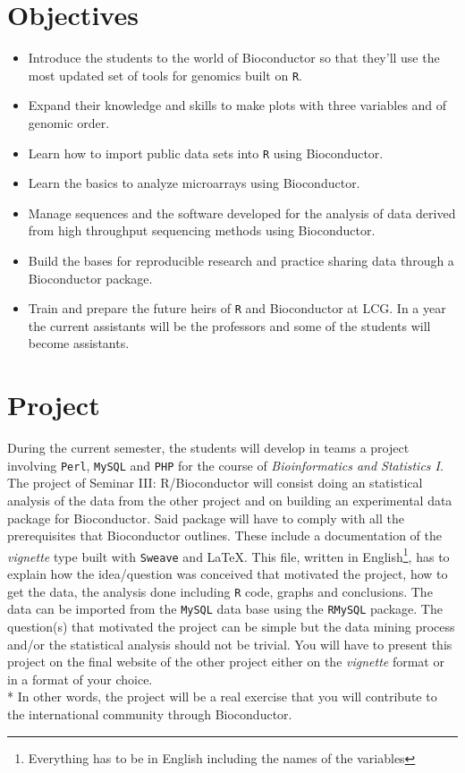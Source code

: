 \documentclass[letterpaper,12pt]{article}
\newcommand{\pl}[1]{\texttt{#1}}
\begin{document}
\section{Objectives}
  \begin{itemize}
  \item Introduce the students to the world of Bioconductor so that they'll use the most updated set of tools for genomics built on \pl{R}.
  \item Expand their knowledge and skills to make plots with three variables and of genomic order.
  \item Learn how to import public data sets into \pl{R} using Bioconductor.
  \item Learn the basics to analyze microarrays using Bioconductor.
  \item Manage sequences and the software developed for the analysis of data derived from high throughput sequencing methods using Bioconductor.
  \item Build the bases for reproducible research and practice sharing data through a Bioconductor package.
  \item Train and prepare the future heirs of \pl{R} and Bioconductor at LCG. In a year the current assistants will be the professors and some of the students will become assistants.
  \end{itemize}

\section{Project}
During the current semester, the students will develop in teams a project involving \pl{Perl}, \pl{MySQL} and \pl{PHP} for the course of \emph{Bioinformatics and Statistics I}. The project of Seminar III: R/Bioconductor will consist doing an statistical analysis of the data from the other project and on building an experimental data package for Bioconductor. Said package will have to comply with all the prerequisites that Bioconductor outlines. These include a documentation of the \emph{vignette} type built with \pl{Sweave} and \LaTeX. This file, written in English\footnote{Everything has to be in English including the names of the variables}, has to explain how the idea/question was conceived that motivated the project, how to get the data, the analysis done including \pl{R} code, graphs and conclusions. The data can be imported from the \pl{MySQL} data base using the \pl{RMySQL} package. The question(s) that motivated the project can be simple but the data mining process and/or the statistical analysis should not be trivial. You will have to present this project on the final website of the other project either on the \emph{vignette} format or in a format of your choice.
\\* \indent In other words, the project will be a real exercise that you will contribute to the international community through Bioconductor.
\end{document}

